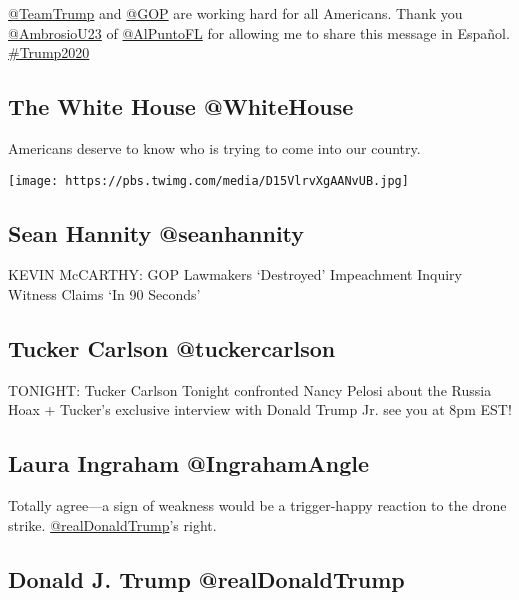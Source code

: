 \href{https://www.twitter.com/TeamTrump}{@TeamTrump} and
\href{https://www.twitter.com/GOP}{@GOP} are working hard for all
Americans. Thank you
\href{https://www.twitter.com/AmbrosioU23}{@AmbrosioU23} of
\href{https://www.twitter.com/AlPuntoFL}{@AlPuntoFL} for allowing me to
share this message in Español.
\href{https://twitter.com/search?q=\%23Trump2020}{\#Trump2020}

\hypertarget{the-white-house-whitehouse}{%
\subsection{The White House
@WhiteHouse}\label{the-white-house-whitehouse}}

Americans deserve to know who is trying to come into our country.

\texttt{[image: https://pbs.twimg.com/media/D15VlrvXgAANvUB.jpg]}

\hypertarget{sean-hannity-seanhannity}{%
\subsection{Sean Hannity @seanhannity}\label{sean-hannity-seanhannity}}

KEVIN McCARTHY: GOP Lawmakers `Destroyed' Impeachment Inquiry Witness
Claims `In 90 Seconds'

\hypertarget{tucker-carlson-tuckercarlson}{%
\subsection{Tucker Carlson
@tuckercarlson}\label{tucker-carlson-tuckercarlson}}

TONIGHT: Tucker Carlson Tonight confronted Nancy Pelosi about the Russia
Hoax + Tucker's exclusive interview with Donald Trump Jr. see you at 8pm
EST!

\hypertarget{laura-ingraham-ingrahamangle}{%
\subsection{Laura Ingraham
@IngrahamAngle}\label{laura-ingraham-ingrahamangle}}

Totally agree---a sign of weakness would be a trigger-happy reaction to
the drone strike.
\href{https://www.twitter.com/realDonaldTrump}{@realDonaldTrump}'s
right.

\hypertarget{donald-j-trump-realdonaldtrump}{%
\subsection{Donald J. Trump
@realDonaldTrump}\label{donald-j-trump-realdonaldtrump}}


